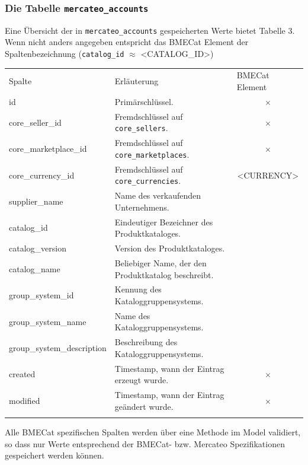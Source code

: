 	\subsubsection{Die Tabelle \texttt{mercateo\_accounts}}
	
	Eine Übersicht der in \texttt{mercateo\_accounts} gespeicherten Werte bietet Tabelle 3. Wenn nicht anders angegeben entspricht das BMECat Element der Spaltenbezeichnung (\texttt{catalog\_id} $\approx$ \textless CATALOG\_ID\textgreater )

	\begin{table}[!htbp]
		\begin{tabularx}{\textwidth \small}{p{4cm} X p{2.8cm} }
			\rowcolor[HTML]{EFEFEF} 
			Spalte & Erläuterung & BMECat Element \\ \cline{1-3} \addlinespace[7pt]
			id & Primärschlüssel. & \multicolumn{1}{c}{\normalsize$\times$} \\
			core\_seller\_id & Fremdschlüssel auf \texttt{core\_sellers}.  & \multicolumn{1}{c}{\normalsize$\times$}  \\ 
			core\_marketplace\_id & Fremdschlüssel auf \texttt{core\_marketplaces}. & \multicolumn{1}{c}{\normalsize$\times$} \\ 
			core\_currency\_id & Fremdschlüssel auf \texttt{core\_currencies}.  &\multicolumn{1}{c}{ \textless CURRENCY\textgreater} \\ 
			supplier\_name & Name des verkaufenden Unternehmens. & \multicolumn{1}{c}{\normalsize \checked}   \\
			catalog\_id & Eindeutiger Bezeichner des Produktkataloges. & \multicolumn{1}{c}{\normalsize \checked}  \\
			catalog\_version & Version des Produktkataloges. & \multicolumn{1}{c}{\normalsize \checked} \\
			catalog\_name & Beliebiger Name, der den Produktkatalog beschreibt. & \multicolumn{1}{c}{\normalsize \checked} \\
			group\_system\_id & Kennung des Kataloggruppensystems. & \multicolumn{1}{c}{\normalsize \checked}  \\
			group\_system\_name & Name des Kataloggruppensystems. & \multicolumn{1}{c}{\normalsize \checked}  \\
			group\_system\_description & Beschreibung des Kataloggruppensystems. & \multicolumn{1}{c}{\normalsize \checked} \\	
			created & Timestamp, wann der Eintrag erzeugt wurde. & \multicolumn{1}{c}{\normalsize$\times$} \\
			modified & Timestamp, wann der Eintrag geändert wurde. & \multicolumn{1}{c}{\normalsize$\times$}\\\addlinespace[7pt] \cline{1-3} 
		\end{tabularx}%
	\end{table}
	Alle BMECat spezifischen Spalten werden über eine Methode im Model validiert, so dass nur Werte entsprechend der BMECat- bzw. Mercateo Spezifikationen gespeichert werden können.
	 
